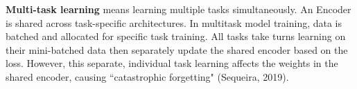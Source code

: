 
\textbf{Multi-task learning} means learning multiple tasks simultaneously. An Encoder is shared across task-specific architectures. In multitask model training, data is batched and allocated for specific task training. All tasks take turns learning on their mini-batched data then separately update the shared encoder based on the loss. However, this separate, individual task learning affects the weights in the shared encoder, causing ``catastrophic forgetting" (Sequeira, 2019). 











